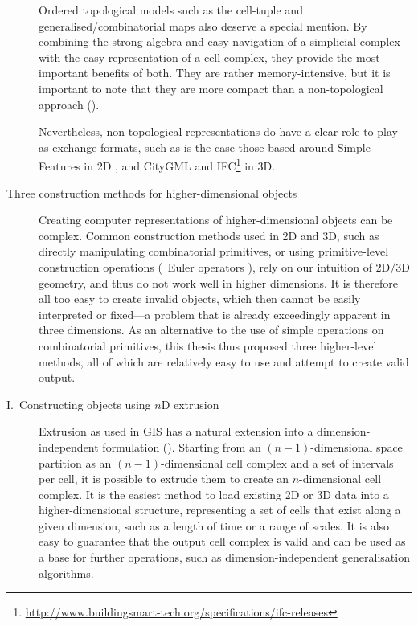 \begin{description}
Ordered topological models such as the cell-tuple \citep{Brisson93} and generalised/combinatorial maps \citep{Lienhardt94} also deserve a special mention.
By combining the strong algebra and easy navigation of a simplicial complex with the easy representation of a cell complex, they provide the most important benefits of both.
They are rather memory-intensive, but it is important to note that they are more compact than a non-topological approach ().

Nevertheless, non-topological representations do have a clear role to play as exchange formats, such as is the case those based around Simple Features in 2D \citep{SimpleFeatures1}, and CityGML \citep{CityGML2} and IFC\footnote{\url{http://www.buildingsmart-tech.org/specifications/ifc-releases}} in 3D.

\item[Three construction methods for higher-dimensional objects]

Creating computer representations of higher-dimensional objects can be complex.
Common construction methods used in 2D and 3D, such as directly manipulating combinatorial primitives, or using primitive-level construction operations (\eg\ Euler operators \citep{Mantyla88}), rely on our intuition of 2D/3D geometry, and thus do not work well in higher dimensions.
It is therefore all too easy to create invalid objects, which then cannot be easily interpreted or fixed---a problem that is already exceedingly apparent in three dimensions.
As an alternative to the use of simple operations on combinatorial primitives, this thesis thus proposed three higher-level methods, all of which are relatively easy to use and attempt to create valid output.


\item[I.\ Constructing objects using $n$D extrusion]

Extrusion as used in GIS has a natural extension into a dimension-independent formulation ().
Starting from an $(n-1)$-dimensional space partition as an $(n-1)$-dimensional cell complex and a set of intervals per cell, it is possible to extrude them to create an $n$-dimensional cell complex.
It is the easiest method to load existing 2D or 3D data into a higher-dimensional structure, representing a set of cells that exist along a given dimension, such as a length of time or a range of scales.
It is also easy to guarantee that the output cell complex is valid and can be used as a base for further operations, such as dimension-independent generalisation algorithms.


\end{description}
